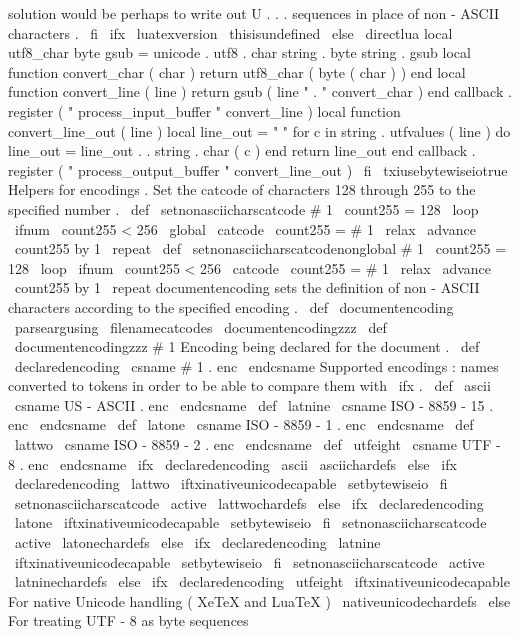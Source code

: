 {{{{{solution
would
be
perhaps
to
write
out
U
{
.
.
.
}
sequences
in
%
place
of
non
-
ASCII
characters
.
\
fi
\
ifx
\
luatexversion
\
thisisundefined
\
else
\
directlua
{
local
utf8_char
byte
gsub
=
unicode
.
utf8
.
char
string
.
byte
string
.
gsub
local
function
convert_char
(
char
)
return
utf8_char
(
byte
(
char
)
)
end
local
function
convert_line
(
line
)
return
gsub
(
line
"
.
"
convert_char
)
end
callback
.
register
(
"
process_input_buffer
"
convert_line
)
local
function
convert_line_out
(
line
)
local
line_out
=
"
"
for
c
in
string
.
utfvalues
(
line
)
do
line_out
=
line_out
.
.
string
.
char
(
c
)
end
return
line_out
end
callback
.
register
(
"
process_output_buffer
"
convert_line_out
)
}
\
fi
\
txiusebytewiseiotrue
}
%
Helpers
for
encodings
.
%
Set
the
catcode
of
characters
128
through
255
to
the
specified
number
.
%
\
def
\
setnonasciicharscatcode
#
1
{
%
\
count255
=
128
\
loop
\
ifnum
\
count255
<
256
\
global
\
catcode
\
count255
=
#
1
\
relax
\
advance
\
count255
by
1
\
repeat
}
\
def
\
setnonasciicharscatcodenonglobal
#
1
{
%
\
count255
=
128
\
loop
\
ifnum
\
count255
<
256
\
catcode
\
count255
=
#
1
\
relax
\
advance
\
count255
by
1
\
repeat
}
%
documentencoding
sets
the
definition
of
non
-
ASCII
characters
%
according
to
the
specified
encoding
.
%
\
def
\
documentencoding
{
\
parseargusing
\
filenamecatcodes
\
documentencodingzzz
}
\
def
\
documentencodingzzz
#
1
{
%
%
%
Encoding
being
declared
for
the
document
.
\
def
\
declaredencoding
{
\
csname
#
1
.
enc
\
endcsname
}
%
%
%
Supported
encodings
:
names
converted
to
tokens
in
order
to
be
able
%
to
compare
them
with
\
ifx
.
\
def
\
ascii
{
\
csname
US
-
ASCII
.
enc
\
endcsname
}
%
\
def
\
latnine
{
\
csname
ISO
-
8859
-
15
.
enc
\
endcsname
}
%
\
def
\
latone
{
\
csname
ISO
-
8859
-
1
.
enc
\
endcsname
}
%
\
def
\
lattwo
{
\
csname
ISO
-
8859
-
2
.
enc
\
endcsname
}
%
\
def
\
utfeight
{
\
csname
UTF
-
8
.
enc
\
endcsname
}
%
%
\
ifx
\
declaredencoding
\
ascii
\
asciichardefs
%
\
else
\
ifx
\
declaredencoding
\
lattwo
\
iftxinativeunicodecapable
\
setbytewiseio
\
fi
\
setnonasciicharscatcode
\
active
\
lattwochardefs
%
\
else
\
ifx
\
declaredencoding
\
latone
\
iftxinativeunicodecapable
\
setbytewiseio
\
fi
\
setnonasciicharscatcode
\
active
\
latonechardefs
%
\
else
\
ifx
\
declaredencoding
\
latnine
\
iftxinativeunicodecapable
\
setbytewiseio
\
fi
\
setnonasciicharscatcode
\
active
\
latninechardefs
%
\
else
\
ifx
\
declaredencoding
\
utfeight
\
iftxinativeunicodecapable
%
For
native
Unicode
handling
(
XeTeX
and
LuaTeX
)
\
nativeunicodechardefs
\
else
%
For
treating
UTF
-
8
as
byte
sequences
}}}}}
